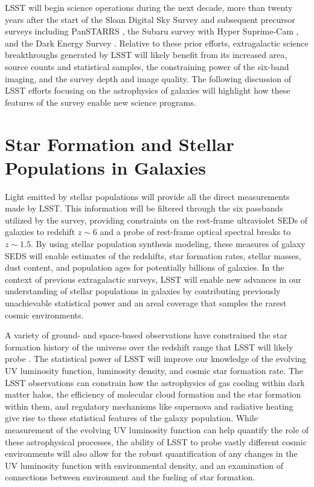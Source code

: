 {LSST will begin science operations during the next decade,
more than twenty years after the start of the Sloan
Digital Sky Survey \citep{york2000a} and subsequent precursor surveys
including PanSTARRS \citep{kaiser2010a}, the Subaru
survey with Hyper Suprime-Cam \citep{miyazaki2012a}, and the Dark
Energy Survey \citep{flaugher2005a}. Relative to these prior
efforts, extragalactic science breakthroughs
generated by LSST will likely benefit from its increased area, source
counts and statistical samples, the constraining power of the
six-band imaging, and the survey depth and image quality. The following
discussion of LSST efforts focusing on the astrophysics of galaxies
will highlight how these features of the survey enable new science
programs.



\section{Star Formation and Stellar Populations in Galaxies}
\label{sec:sci:gal:bkgnd:stars}

Light emitted by stellar populations will
provide all the direct measurements made by
LSST. This information will be filtered through
the six passbands utilized by the survey,
providing constraints on the
rest-frame ultraviolet SEDs of galaxies to
redshift $z\sim6$ and a probe of rest-frame
optical spectral breaks to $z\sim1.5$. By
using stellar population synthesis modeling,
these measures of galaxy SEDS will enable 
estimates of the redshifts, star formation rates,
stellar masses, dust content, and 
population ages for potentially 
billions of galaxies. In the context of previous
extragalactic surveys, LSST
will enable new advances in our understanding
of stellar populations in galaxies by contributing
previously unachievable statistical power and an
areal coverage that samples the rarest cosmic
environments.

A variety of ground- and space-based observations
have constrained the
star formation history of the universe over the
redshift range that LSST will likely probe
\citep[for a recent review, see][]{madau2014a}.
The statistical power of LSST will improve our
knowledge of the evolving UV luminosity function,
luminosity density, and cosmic
star formation rate. The LSST observations can
constrain how the astrophysics of gas
cooling within dark matter halos, the efficiency
of molecular cloud formation and the star formation
within them, and
regulatory mechanisms like supernova and radiative
heating give rise to these statistical features
of the galaxy population. While measurement of
the evolving UV luminosity function can
help quantify the role of these 
astrophysical processes, the ability of LSST
to probe vastly different cosmic environments
will also allow for the robust quantification of any
changes in the UV luminosity function with
environmental density, and an examination of 
connections between environment and the fueling
of star formation.

}

